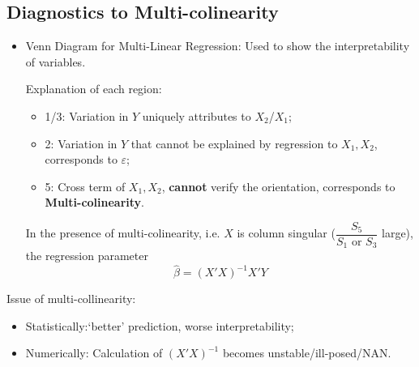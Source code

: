 \subsection{Diagnostics to Multi-colinearity}\label{SubSubSectionDiagnosticsToMultiCollinearity}
\begin{itemize}[topsep=2pt,itemsep=2pt]
    \item Venn Diagram for Multi-Linear Regression: Used to show the interpretability of variables.
    
    \begin{center}
    \end{center}

    Explanation of each region:
    \begin{itemize}[topsep=2pt,itemsep=2pt]
        \item 1/3: Variation in $ Y $ uniquely attributes to $ X_2 $/$ X_1 $;
        \item 2: Variation in $ Y $ that cannot be explained by regression to $ X_1,X_2 $, corresponds to $ \varepsilon  $;
        \item 5: Cross term of $ X_1,X_2 $, \textbf{cannot} verify the orientation, corresponds to \textbf{Multi-colinearity}.
    \end{itemize}

    In the presence of multi-colinearity, i.e. $ X $ is column singular ($ \dfrac{S_5}{S_1\text{ or }S_3} $ large), the regression parameter
    \begin{equation}
        \hat{\beta }=(X'X)^{-1}X'Y
    \end{equation}

    
    
   
\end{itemize}

     Issue of multi-collinearity: 
    \begin{itemize}[topsep=2pt,itemsep=2pt]
        \item Statistically:`better' prediction, worse interpretability;
        \item Numerically: Calculation of $ (X'X)^{-1} $ becomes unstable/ill-posed/NAN.
    \end{itemize}


